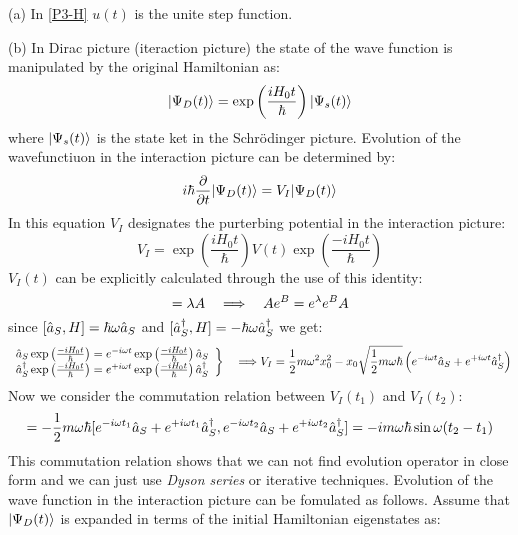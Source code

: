 \begin{homeworkProblem}
\begin{homeworkSection}{(a)}
In \eqref{P3-H} $u(t)$ is the unite step function.
\end{homeworkSection}
\begin{homeworkSection}{(b)}
In Dirac picture (iteraction picture) the state of the wave function is manipulated by the original Hamiltonian as:
\begin{equation}
|\Psi_D(t)\rangle=\exp\left(\frac{iH_0t}{\hbar}\right)|\Psi_s(t)\rangle
\end{equation}
where $|\Psi_s(t)\rangle$ is the state ket in the Schr\"odinger picture. Evolution of the wavefunctiuon in the interaction picture can be determined by:
\begin{equation}\label{P3-I}
i\hbar\dfrac{\partial}{\partial t}|\Psi_D(t)\rangle=V_I|\Psi_D(t)\rangle
\end{equation}
In this equation $V_I$ designates the purterbing potential in the interaction picture:
\begin{equation*}
V_I=\exp\left(\frac{iH_0t}{\hbar}\right)V(t)\exp\left(\frac{-iH_0t}{\hbar}\right)
\end{equation*}
$V_I(t)$ can be explicitly calculated through the use of this identity:
\begin{equation}
[A,B]=\lambda A\quad\Lrw\quad Ae^{B}=e^{\lambda}e^{B}A
\end{equation}
since $[\Hat{a}_S,H]=\hbar\omega \Hat{a}_S$ and $[\Hat{a}_S^\dagger,H]=-\hbar\omega \Hat{a}_S^\dagger$ we get:
\begin{equation}
\left.\begin{array}{l}
\Hat{a}_S\exp\left(\frac{-iH_0t}{\hbar}\right)=e^{-i\omega t}\exp\left(\frac{-iH_0t}{\hbar}\right)\Hat{a}_S\\
\Hat{a}_S^\dagger\exp\left(\frac{-iH_0t}{\hbar}\right)=e^{+i\omega t}\exp\left(\frac{-iH_0t}{\hbar}\right)\Hat{a}_S^\dagger \\
\end{array}\right\}  
\quad\Longrightarrow V_I=\frac{1}{2}m\omega^2 x_0^2- x_0\sqrt{\frac{1}{2}m\omega\hbar}\left(e^{-i\omega t}\Hat{a}_S+e^{+i\omega t}\Hat{a}_S^\dagger\right)
\end{equation}
Now we consider the commutation relation between $V_I(t_1)$ and $V_I(t_2)$:
\begin{equation}
[V_I(t_1),V_I(t_2)]=-\frac{1}{2}m\omega\hbar[e^{-i\omega t_1}\A{a}_S+e^{+i\omega t_1}\A{a}_S^\dagger,e^{-i\omega t_2}\A{a}_S+e^{+i\omega t_2}\A{a}_S^\dagger]=
-im\omega\hbar\sin\omega(t_2-t_1)
\end{equation}
This commutation relation shows that we can not find evolution operator in close form and we can just use \textit{Dyson series} or iterative techniques. Evolution of the wave function in the interaction picture can be fomulated as follows. Assume that $|\Psi_D(t)\rangle$ is expanded in terms of the initial Hamiltonian eigenstates as:

\end{homeworkSection}
\end{homeworkProblem}
